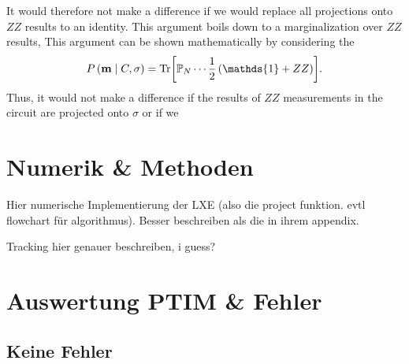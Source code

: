 It would therefore not make a difference if we
would replace all projections onto $ZZ$ results to an identity. This argument
boils down to a marginalization over $ZZ$ results, 
This argument
can be shown mathematically by considering the 
\begin{align}
  P\left( \mathbf{m} \mid C, \sigma \right) = \Tr[\mathbb{P}_N \cdots
  \frac{1}{2} \left( \mathds{1} + ZZ \right) ]
.\end{align}
Thus, it would not make a difference if the
results of $ZZ$ measurements in the circuit are projected onto $\sigma$ or if
we 

\section{Numerik \& Methoden}
\label{sec:lxe-numeric}
Hier numerische Implementierung der LXE (also die project funktion. evtl
flowchart für algorithmus). Besser beschreiben als die in ihrem appendix.

Tracking hier genauer beschreiben, i guess?

\section{Auswertung PTIM \& Fehler}
\subsection{Keine Fehler}
